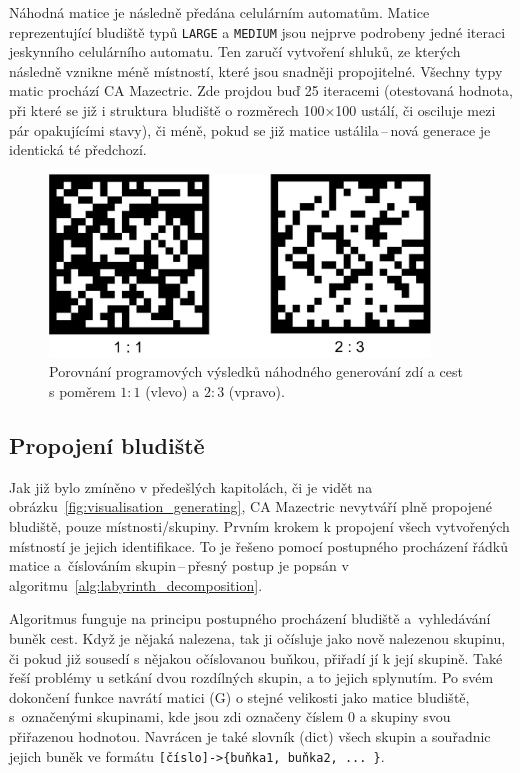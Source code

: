 Náhodná matice je následně předána celulárním automatům. Matice reprezentující bludiště typů \verb|LARGE| a \verb|MEDIUM| jsou nejprve podrobeny jedné iteraci jeskynního celulárního automatu. Ten zaručí vytvoření shluků, ze kterých následně vznikne méně místností, které jsou snadněji propojitelné. Všechny typy matic prochází CA Mazectric. Zde projdou buď 25 iteracemi (otestovaná hodnota, při které se již i struktura bludiště o rozměrech 100×100 ustálí, či osciluje mezi pár opakujícími stavy), či méně, pokud se již matice ustálila\,--\,nová generace je identická té předchozí.

\begin{figure}[H]
    \centering
    \includegraphics[width=0.9\textwidth]{obrazky-figures/ch4/randi.pdf}
    \caption{Porovnání programových výsledků náhodného generování zdí a cest s poměrem $1:1$ (vlevo) a $2:3$ (vpravo).}
    \label{fig:randi}
\end{figure}

\subsection*{Propojení bludiště}
Jak již bylo zmíněno v předešlých kapitolách, či je vidět na obrázku~\ref{fig:visualisation_generating}, CA Mazectric nevytváří plně propojené bludiště, pouze místnosti/skupiny. Prvním krokem k propojení všech vytvořených místností je jejich identifikace. To je řešeno pomocí postupného procházení řádků matice a~číslováním skupin\,--\,přesný postup je popsán v algoritmu~\ref{alg:labyrinth_decomposition}. 

Algoritmus funguje na principu postupného procházení bludiště a~vyhledávání buněk cest. Když je nějaká nalezena, tak ji očísluje jako nově nalezenou skupinu, či pokud již sousedí s nějakou očíslovanou buňkou, přiřadí jí k její skupině. Také řeší problémy u setkání dvou rozdílných skupin, a to jejich splynutím. Po svém dokončení funkce navrátí matici ($\text{G}$) o stejné velikosti jako matice bludiště, s~označenými skupinami, kde jsou zdi označeny číslem 0 a skupiny svou přiřazenou hodnotou. Navrácen je také slovník ($\text{dict}$) všech skupin a souřadnic jejich buněk ve formátu \verb|[číslo]->{buňka1, buňka2, ... }|.


